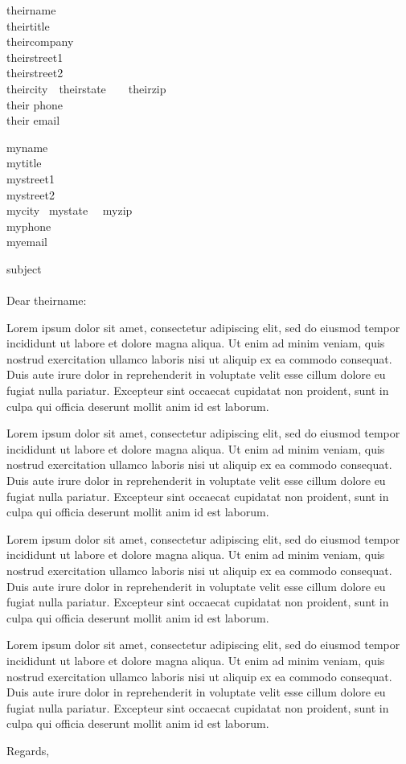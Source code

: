 \documentclass[11pt]{letter}
\date{yyyy-mm-dd}
\begin{document}
\begin{letter}{
theirname \\
theirtitle \\
theircompany \\
theirstreet1 \\
theirstreet2 \\
theircity\ \ theirstate\ \ \ \ theirzip \\
their phone \\
their email
}

myname \\
mytitle \\
mystreet1 \\
mystreet2 \\
mycity~ mystate~~ myzip \\
myphone \\
myemail

\opening{subject \\ \\ Dear theirname:}

Lorem ipsum dolor sit amet, consectetur adipiscing elit, sed do eiusmod tempor incididunt ut labore et dolore magna aliqua. Ut enim ad minim veniam, quis nostrud exercitation ullamco laboris nisi ut aliquip ex ea commodo consequat. Duis aute irure dolor in reprehenderit in voluptate velit esse cillum dolore eu fugiat nulla pariatur. Excepteur sint occaecat cupidatat non proident, sunt in culpa qui officia deserunt mollit anim id est laborum.

Lorem ipsum dolor sit amet, consectetur adipiscing elit, sed do eiusmod tempor incididunt ut labore et dolore magna aliqua. Ut enim ad minim veniam, quis nostrud exercitation ullamco laboris nisi ut aliquip ex ea commodo consequat. Duis aute irure dolor in reprehenderit in voluptate velit esse cillum dolore eu fugiat nulla pariatur. Excepteur sint occaecat cupidatat non proident, sunt in culpa qui officia deserunt mollit anim id est laborum.

Lorem ipsum dolor sit amet, consectetur adipiscing elit, sed do eiusmod tempor incididunt ut labore et dolore magna aliqua. Ut enim ad minim veniam, quis nostrud exercitation ullamco laboris nisi ut aliquip ex ea commodo consequat. Duis aute irure dolor in reprehenderit in voluptate velit esse cillum dolore eu fugiat nulla pariatur. Excepteur sint occaecat cupidatat non proident, sunt in culpa qui officia deserunt mollit anim id est laborum.

Lorem ipsum dolor sit amet, consectetur adipiscing elit, sed do eiusmod tempor incididunt ut labore et dolore magna aliqua. Ut enim ad minim veniam, quis nostrud exercitation ullamco laboris nisi ut aliquip ex ea commodo consequat. Duis aute irure dolor in reprehenderit in voluptate velit esse cillum dolore eu fugiat nulla pariatur. Excepteur sint occaecat cupidatat non proident, sunt in culpa qui officia deserunt mollit anim id est laborum.

\closing{Regards,}
\end{letter}
\end{document}

